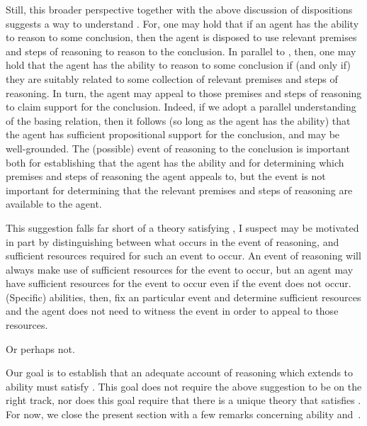 \begin{note}
  Still, this broader perspective together with the above discussion of dispositions suggests a way to understand \EAS{}.
  For, one may hold that if an agent has the ability to reason to some conclusion, then the agent is disposed to use relevant premises and steps of reasoning to reason to the conclusion.
  In parallel to \citeauthor{Moretti:2019wx}, then, one may hold that the agent has the ability to reason to some conclusion if (and only if) they are suitably related to some collection of relevant premises and steps of reasoning.
  In turn, the agent may appeal to those premises and steps of reasoning to claim support for the conclusion.
  Indeed, if we adopt a parallel understanding of the basing relation, then it follows (so long as the agent has the ability) that  the agent has sufficient propositional support for the conclusion, and may be well-grounded.
  The (possible) event of reasoning to the conclusion is important both for establishing that the agent has the ability and for determining which premises and steps of reasoning the agent appeals to, but the event is not important for determining that the relevant premises and steps of reasoning are available to the agent.

  This suggestion falls far short of a theory satisfying \EAS{}, I suspect \EAS{} may be motivated in part by distinguishing between what occurs in the event of reasoning, and sufficient resources required for such an event to occur.
  An event of reasoning will always make use of sufficient resources for the event to occur, but an agent may have sufficient resources for the event to occur even if the event does not occur.
  (Specific) abilities, then, fix an particular event and determine sufficient resources and the agent does not need to witness the event in order to appeal to those resources.

  Or perhaps not.
\end{note}

\begin{note}[Segue]
  Our goal is to establish that an adequate account of reasoning which extends to ability must satisfy \EAS{}.
  This goal does not require the above suggestion to be on the right track, nor does this goal require that there is a unique theory that satisfies \EAS{}.
  For now, we close the present section with a few remarks concerning ability and~\EAS{}.
\end{note}

